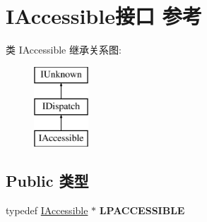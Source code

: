 \hypertarget{interface_i_accessible}{}\section{I\+Accessible接口 参考}
\label{interface_i_accessible}
类 I\+Accessible 继承关系图\+:\begin{figure}[H]
\begin{center}
\leavevmode
\includegraphics[height=3.000000cm]{interface_i_accessible}
\end{center}
\end{figure}
\subsection*{Public 类型}
\begin{DoxyCompactItemize}
\item 
\mbox{\label{interface_i_accessible_a231c299e11b5d14476a02ffea3c1c40a}} 
typedef \hyperlink{interface_i_accessible}{I\+Accessible} $\ast$ {\bfseries L\+P\+A\+C\+C\+E\+S\+S\+I\+B\+LE}
\end{DoxyCompactItemize}
